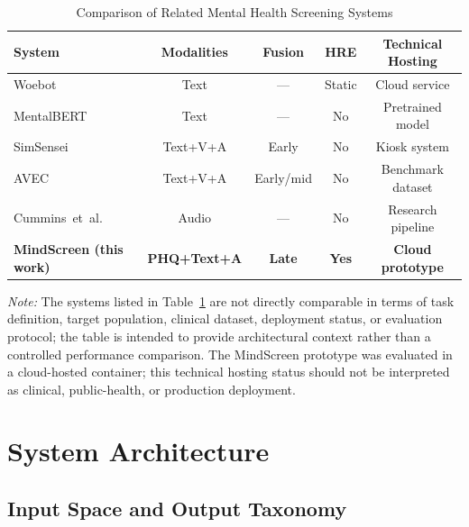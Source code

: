 \documentclass[10pt, conference, letterpaper]{IEEEtran}
\begin{document}
\begin{table}[!t]
\caption{Comparison of Related Mental Health Screening Systems}
\label{tab:related}
\centering
\footnotesize
\setlength{\tabcolsep}{8pt}
\begin{tabular}{@{}lcccc@{}}
\toprule
\textbf{System} & \textbf{Modalities}
  & \textbf{Fusion} & \textbf{HRE} & \textbf{Technical Hosting} \\
\midrule
Woebot~\cite{fitzpatrick2017}        & Text       & —          & Static & Cloud service \\
MentalBERT~\cite{ji2022}             & Text       & —          & No     & Pretrained model \\
SimSensei~\cite{devault2014}         & Text+V+A   & Early      & No     & Kiosk system \\
AVEC~\cite{ringeval2019}             & Text+V+A   & Early/mid  & No     & Benchmark dataset \\
Cummins~et~al.~\cite{cummins2015}   & Audio      & —          & No     & Research pipeline \\
\textbf{MindScreen (this work)}      & \textbf{PHQ+Text+A} & \textbf{Late} & \textbf{Yes} & \textbf{Cloud prototype} \\
\bottomrule
\end{tabular}
\vspace{1ex}

\parbox{0.90\textwidth}{\footnotesize \textit{Note:} The systems listed in
Table~\ref{tab:related} are not directly comparable in terms of task definition,
target population, clinical dataset, deployment status, or evaluation protocol;
the table is intended to provide architectural context rather than a controlled
performance comparison. The MindScreen prototype was evaluated in a cloud-hosted
container; this technical hosting status should not be interpreted as clinical,
public-health, or production deployment.}
\end{table}

\section{System Architecture}
\label{sec:method}

\subsection{Input Space and Output Taxonomy}
\end{document}
